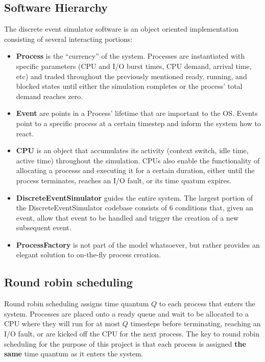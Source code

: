 \documentclass{article}
\begin{document}
\subsection*{Software Hierarchy}
The discrete event simulator software is an object oriented implementation consisting of 
several interacting portions:
\begin{itemize}
    \item{\textbf{Process} is the ``currency'' of the system. Processes are instantiated with specific
          parameters (CPU and I/O burst times, CPU demand, arrival time, etc) and traded throughout the previously
          mentioned ready, running, and blocked states until either the simulation completes or the process' total demand
          reaches zero.}
    \item{\textbf{Event} are points in a Process' lifetime that are important to the OS\@. 
          Events point to a specific process at a certain timestep and inform the system how to react.} 
      \item{\textbf{CPU} is an object that accumulates its activity (context switch, idle time, active time) throughout 
          the simulation. CPUs also enable the functionality of allocating a processs and executing it for a certain duration,
          either until the process terminates, reaches an I/O fault, or its time quatum expires.}    
    \item{\textbf{DiscreteEventSimulator} guides the entire system. The largest portion of the DiscreteEventSimulator codebase
         consists of 6 conditions that, given an event, allow that event to be handled and trigger the creation of a new subsequent
         event.}
    \item{\textbf{ProcessFactory} is not part of the model whatsoever, but rather provides an elegant solution to on-the-fly
        process creation.}
\end{itemize}
\subsection*{Round robin scheduling}
Round robin scheduling assigns time quantum $Q$ to each process that enters the system. 
Processes are placed onto a ready queue and wait to be allocated to a CPU where they will
run for at most $Q$ timesteps before terminating, reaching an I/O fault, or are kicked off 
the CPU for the next process. 
The key to round robin scheduling for the purpose of this project is that each process
is assigned \textbf{the same} time quantum as it enters the system.
\end{document}
